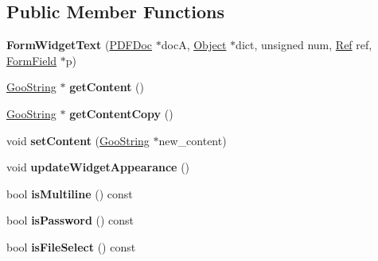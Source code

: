 \subsection*{Public Member Functions}
\begin{DoxyCompactItemize}
\item 
\mbox{\label{class_form_widget_text_a9092f6d3df6f5806fe2ff078096878ab}} 
{\bfseries Form\+Widget\+Text} (\hyperlink{class_p_d_f_doc}{P\+D\+F\+Doc} $\ast$docA, \hyperlink{class_object}{Object} $\ast$dict, unsigned num, \hyperlink{struct_ref}{Ref} ref, \hyperlink{class_form_field}{Form\+Field} $\ast$p)
\item 
\mbox{\label{class_form_widget_text_a3f84c5bb1461427fed8f16caea8c6cf0}} 
\hyperlink{class_goo_string}{Goo\+String} $\ast$ {\bfseries get\+Content} ()
\item 
\mbox{\label{class_form_widget_text_a5eda0b4c34a29253e9d4e1efb8927f12}} 
\hyperlink{class_goo_string}{Goo\+String} $\ast$ {\bfseries get\+Content\+Copy} ()
\item 
\mbox{\label{class_form_widget_text_a8ab2a7123214ca5c107d3d56c0a4734b}} 
void {\bfseries set\+Content} (\hyperlink{class_goo_string}{Goo\+String} $\ast$new\+\_\+content)
\item 
\mbox{\label{class_form_widget_text_a8d172acbcf2f4711b793f3b8e565e97c}} 
void {\bfseries update\+Widget\+Appearance} ()
\item 
\mbox{\label{class_form_widget_text_ac8535d2b447a382dec4245b5cb241f06}} 
bool {\bfseries is\+Multiline} () const
\item 
\mbox{\label{class_form_widget_text_a5afd23b8d2de52ab0f66493be7032dc8}} 
bool {\bfseries is\+Password} () const
\item 
\mbox{\label{class_form_widget_text_a08acb012ad8d3d83ac4061c621e77f64}} 
bool {\bfseries is\+File\+Select} () const
\item 
\mbox{\label{class_form_widget_text_adc152542dd0d72eb68ce50ebdb9f5b60}} 

\end{DoxyCompactItemize}
